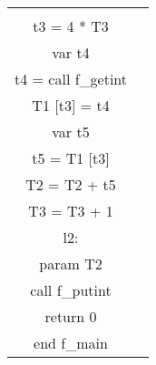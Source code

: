 \documentclass{ctexart}
\newenvironment{typewriterfont}{\ttfamily}{\par}
\begin{document}
\begin{table}[H]
\begin{typewriterfont}
\begin{tabular}{|c|c|}
{var t3\\
t3 = 4 * T3\\
var t4\\
t4 = call f\_getint\\
T1 [t3] = t4\\
var t5\\
t5 = T1 [t3]\\
T2 = T2 + t5\\
T3 = T3 + 1\\
l2:\\
param T2\\
call f\_putint\\
return 0\\
end f\_main
} \\
        \hline
    \end{tabular}
    \end{typewriterfont}
\end{table}
\end{document}
